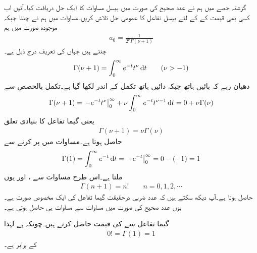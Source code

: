 گزشتہ حصے میں ہم نے عدد صحیح کی صورت میں بیسل مساوات کا ایک حل دریافت کیا۔آئیں اب کسی بھی قیمت کے  کے لئے بیسل تفاعل کا عمومی حل تلاش کریں۔مساوات  میں ہم نے  چننا جبکہ موجودہ صورت میں ہم
\begin{align}\label{مساوات_بیسل_عددی_سر_عمومی}
a_0=\frac{1}{2^\nu \Gamma (\nu+1)}
\end{align}
چنتے ہیں جہاں   کی تعریف درج ذیل ہے۔
\begin{align}\label{مساوات_بیسل_گیما_الف}
\Gamma(\nu+1)=\int_{0}^{\infty}e^{-t} t^{\nu}\dif t\quad \quad (\nu >-1)
\end{align}
دھیان رہے کہ بائیں ہاتھ  جبکہ دائیں ہاتھ تکمل کے اندر  لکھا گیا ہے۔تکمل بالحصص سے
\begin{align*}
\Gamma(\nu+1)=\left. -e^{-t}t^{\nu}\right|_{0}^{\infty}+\nu\int_{0}^{\infty} e^{-t}t^{\nu-1}\dif t=0+\nu\Gamma(\nu)
\end{align*}
یعنی گیما تفاعل کا بنیادی تعلق
\begin{align}\label{مساوات_بیسل_گیما_ب}
\Gamma(\nu+1)=\nu\Gamma(\nu)
\end{align}
حاصل ہوتا ہے۔مساوات  میں  پر کرنے سے 
\begin{align*}
\Gamma(1)=\int_{0}^{\infty}e^{-t}\dif t=\left.-e^{-t}\right|_{0}^{\infty}=0-(-1)=1
\end{align*}
ملتا ہے۔اس طرح مساوات  سے ،  اور یوں 
\begin{align}\label{مساوات_بیسل_گیما_بطور_عدد_ضربیہ}
\Gamma(n+1)=n!\quad \quad n=0,1,2,\cdots
\end{align}
حاصل ہوتا ہے۔آپ دیکھ سکتے ہیں کہ عدد ضربی درحقیقت گیما تفاعل کی ایک مخصوص صورت ہے۔یوں عدد صحیح  کی صورت میں مساوات  سے مساوات  ہی حاصل ہوتی ہے۔

گیما تفاعل سے  کی قیمت حاصل کرتے ہیں۔چونکہ  ہے لہٰذا 
\begin{align}\label{مساوات_بیسل_گیما_پ}
0!=\Gamma(1)=1
\end{align}
کے برابر ہے۔

